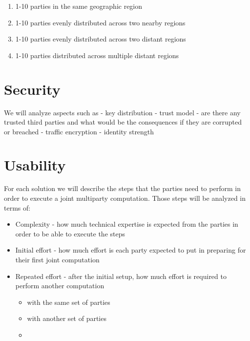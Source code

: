 \begin{enumerate}
\def\labelenumi{\arabic{enumi}.}
\tightlist
\item
  1-10 parties in the same geographic region
\item
  1-10 parties evenly distributed across two nearby regions
\item
  1-10 parties evenly distributed across two distant regions
\item
  1-10 parties distributed across multiple distant regions
\end{enumerate}

\hypertarget{security}{%
\section{Security}\label{security}}

We will analyze aspects such as - key distribution - trust model - are
there any trusted third parties and what would be the consequences if
they are corrupted or breached - traffic encryption - identity strength

\hypertarget{usability}{%
\section{Usability}\label{usability}}

For each solution we will describe the steps that the parties need to
perform in order to execute a joint multiparty computation. Those steps
will be analyzed in terms of:

\begin{itemize}
\tightlist
\item
  Complexity - how much technical expertise is expected from the parties
  in order to be able to execute the steps
\item
  Initial effort - how much effort is each party expected to put in
  preparing for their first joint computation
\item
  Repeated effort - after the initial setup, how much effort is required
  to perform another computation

  \begin{itemize}
  \tightlist
  \item
    with the same set of parties
  \item
    with another set of parties
  \item
  \end{itemize}
\end{itemize}

